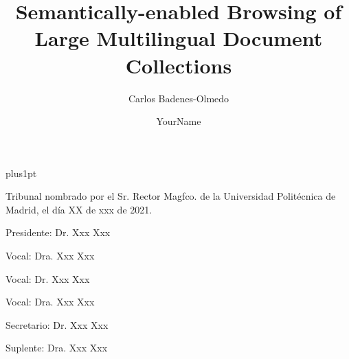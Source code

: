 \documentclass[twoside,11pt]{Latex/Classes/PhDthesisPSnPDF}
\title{Semantically-enabled Browsing of Large Multilingual Document Collections}
\author{{\hspace{16mm} Carlos Badenes-Olmedo }}
\author{YourName}
\begin{document}

\renewcommand\baselinestretch{1.2}
\baselineskip=18pt plus1pt

\theoremstyle{plain}
\newtheorem{thm}{Theorem}[chapter] %

\theoremstyle{definition}
\newtheorem{defn}[thm]{Definition} %

\newcommand{\attention}[1]{{\color{red}\textbf{#1}}}
\newcommand{\comm}[1]{{\color{red}(Comment:#1)}}
\newcommand{\duda}[1]{{\color{red}(DUDA:#1)}}

\renewcommand\appendixname{ANNEX}


\frontmatter
\maketitle  %



\pagestyle{plain}
\cleardoublepage
\pagestyle{plain}

\noindent Tribunal nombrado por el Sr. Rector Magfco. de la Universidad Polit\'{e}cnica de
Madrid, el d\'{i}a XX de xxx de 2021.

\vspace{10mm}
Presidente:\hspace{0.3mm} Dr. Xxx Xxx

\vspace{5mm}
Vocal: \hspace{6.7mm} Dra. Xxx Xxx 

\vspace{5mm}
Vocal: \hspace{6.7mm} Dr. Xxx Xxx

\vspace{5mm}
Vocal: \hspace{6.7mm} Dra. Xxx Xxx

\vspace{5mm}
Secretario:\hspace{0.65mm} Dr. Xxx Xxx

\vspace{5mm}
Suplente: \hspace{1.5mm} Dra. Xxx Xxx
\end{document}
